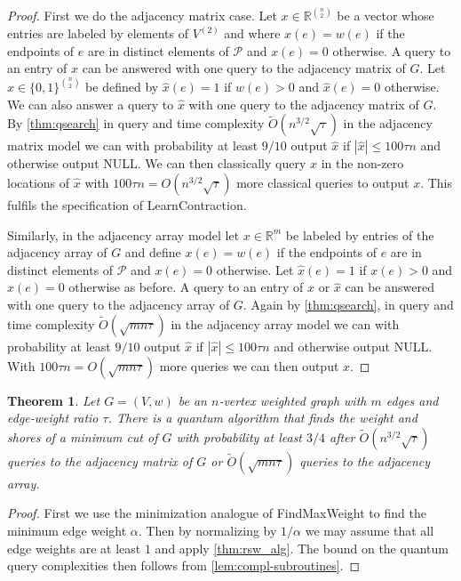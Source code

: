 \documentclass[10pt,a4paper]{article}
\newcommand{\R}{\mathbb{R}}
\newcommand{\Pcal}{\mathcal{P}}
\newcommand{\tO}{\tilde O}
\newcommand{\1}{\mathbf{1}}
\newtheorem{theorem}{Theorem}
\theoremstyle{definition}
\begin{document}
\begin{proof}
First we do the adjacency matrix case.  Let $x \in \R^{\binom{n}{2}}$ be a vector whose entries are labeled by elements of $V^{(2)}$ and where $x(e) = w(e)$ if the endpoints of $e$ are in distinct elements of $\Pcal$ and $x(e) = 0$ otherwise.  
A query to an entry of $x$ can be answered with one query to the adjacency matrix of $G$.  Let $\hat{x} \in \{0,1\}^{\binom{n}{2}}$ be defined by $\hat{x}(e) = 1$ if $w(e) > 0$ and $\hat{x}(e) = 0$ otherwise.  We can also answer a query to $\hat{x}$ 
with one query to the adjacency matrix of $G$.  By \cref{thm:qsearch} in query and time complexity 
$\tO(n^{3/2}\sqrt{\tau})$ in the adjacency matrix model we can with probability at least $9/10$ 
output $\hat{x}$ if $|\hat{x}| \le 100 \tau n$ and otherwise output NULL.  We can then classically query $x$ in the non-zero locations of $\hat{x}$ with $100\tau n =O(n^{3/2} \sqrt{\tau})$ more classical queries to output $x$.  
This fulfils the specification of LearnContraction.

Similarly, in the adjacency array model let $x \in \R^{m}$ be labeled by entries of the adjacency array of $G$ and define $x(e) = w(e)$ if the endpoints of $e$ are in distinct elements of $\Pcal$ and 
$x(e) = 0$ otherwise.  Let $\hat{x}(e)=1$ if $x(e) >0$ and $\hat{x}(e)=0$ otherwise as before.
A query to an entry of $x$ or $\hat{x}$ can be answered with one query to the adjacency array of $G$.  Again by \cref{thm:qsearch}, in query and time complexity $\tO(\sqrt{mn \tau})$ in the adjacency array model we can with probability at least $9/10$ 
output $\hat{x}$ if $|\hat{x}| \le 100 \tau n$ and otherwise output NULL.  With $100 \tau n = O(\sqrt{mn\tau})$ more queries we can then output $x$.
\end{proof}


\begin{theorem}
\label{thm:main}
Let $G =(V,w)$ be an $n$-vertex weighted graph with $m$ edges and edge-weight ratio $\tau$.  There is a quantum algorithm that finds the 
weight and shores of a minimum cut of $G$ with probability at least $3/4$ after 
$\tO(n^{3/2}\sqrt{\tau})$ queries to the adjacency matrix of $G$ or $\tO(\sqrt{mn\tau})$ queries to the adjacency array.
\end{theorem}

\begin{proof}
First we use the minimization analogue of FindMaxWeight to find the minimum edge weight $\alpha$.  Then by normalizing by $1/\alpha$ we may assume that all 
edge weights are at least $1$ and apply \cref{thm:rsw_alg}.  The bound on the quantum query complexities then follows from \cref{lem:compl-subroutines}.
\end{proof}
\end{document}
